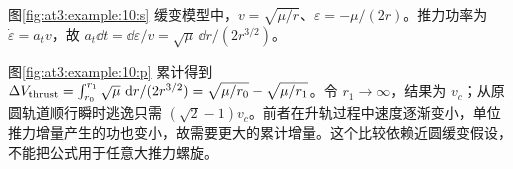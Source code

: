 \begin{solution}
  图\ref{fig:at3:example:10:s} 缓变模型中，$v=\sqrt{\mu/r}$、$\varepsilon=-\mu/(2r)$。推力功率为 $\dot\varepsilon=a_tv$，故 $a_t\dd t=\dd\varepsilon/v=\sqrt\mu\,\dd r/(2r^{3/2})$。

  图\ref{fig:at3:example:10:p} 累计得到 $\Delta V_{\rm thrust}=\int_{r_0}^{r_1}\sqrt\mu\,\mathop{}\!\mathrm d r/(2r^{3/2})=\sqrt{\mu/r_0}-\sqrt{\mu/r_1}$。令 $r_1\to\infty$，结果为 $v_c$；从原圆轨道顺行瞬时逃逸只需 $(\sqrt2-1)v_c$。前者在升轨过程中速度逐渐变小，单位推力增量产生的功也变小，故需要更大的累计增量。这个比较依赖近圆缓变假设，不能把公式用于任意大推力螺旋。\end{solution}

